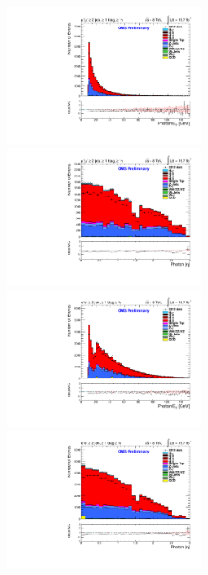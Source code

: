 \begin{figure}
\includegraphics[width=0.5\textwidth]{Plots/ControlPlots/TTbarDiLeptonAnalysis/MuMu/Photons/AllPhotons/Photon_ET_splitTTbar_ratio.pdf}
\includegraphics[width=0.5\textwidth]{Plots/ControlPlots/TTbarDiLeptonAnalysis/MuMu/Photons/AllPhotons/Photon_AbsEta_splitTTbar_ratio.pdf}\\
\includegraphics[width=0.5\textwidth]{Plots/ControlPlots/TTbarDiLeptonAnalysis/EE/Photons/AllPhotons/Photon_ET_splitTTbar_ratio.pdf}
\includegraphics[width=0.5\textwidth]{Plots/ControlPlots/TTbarDiLeptonAnalysis/EE/Photons/AllPhotons/Photon_AbsEta_splitTTbar_ratio.pdf}\\

\end{figure}
